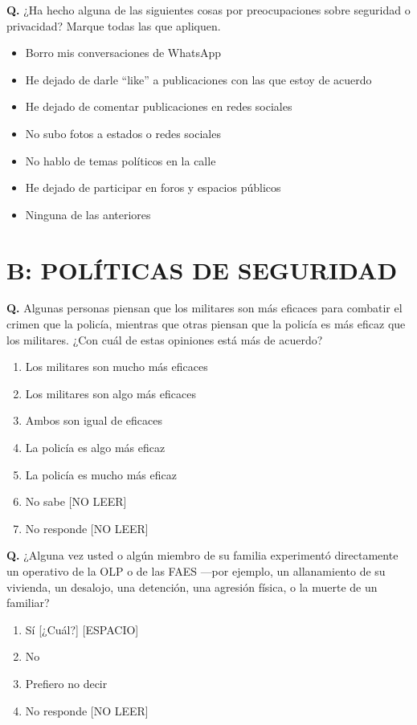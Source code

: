 \documentclass[11pt,letterpaper]{article}
\newcounter{question}
\newcommand{\question}[1]{%
  \stepcounter{question}%
  \vspace{0.3em}%
  \noindent\textbf{Q\thequestion.} #1%
}
\newenvironment{responses}
{\begin{enumerate}[label=(\arabic*), leftmargin=2em, itemsep=0em, parsep=0em, topsep=0em]}
{\end{enumerate}\vspace{0.3em}}
\newenvironment{multiplechoice}
{\begin{itemize}[label=\textbf{[~]}, leftmargin=2em, itemsep=0em, parsep=0em, topsep=0em]}
{\end{itemize}\vspace{0.3em}}
\begin{document}
\question{¿Ha hecho alguna de las siguientes cosas por preocupaciones sobre seguridad o privacidad? Marque todas las que apliquen.}
\begin{multiplechoice}
\item Borro mis conversaciones de WhatsApp
\item He dejado de darle ``like'' a publicaciones con las que estoy de acuerdo
\item He dejado de comentar publicaciones en redes sociales
\item No subo fotos a estados o redes sociales
\item No hablo de temas políticos en la calle
\item He dejado de participar en foros y espacios públicos
\item Ninguna de las anteriores
\end{multiplechoice}

\section{B: POLÍTICAS DE SEGURIDAD}

\question{Algunas personas piensan que los militares son más eficaces para combatir el crimen que la policía, mientras que otras piensan que la policía es más eficaz que los militares. ¿Con cuál de estas opiniones está más de acuerdo?}
\begin{responses}
\item Los militares son mucho más eficaces
\item Los militares son algo más eficaces
\item Ambos son igual de eficaces
\item La policía es algo más eficaz
\item La policía es mucho más eficaz
\item[(98)] No sabe [NO LEER]
\item[(99)] No responde [NO LEER]
\end{responses}

\question{¿Alguna vez usted o algún miembro de su familia experimentó directamente un operativo de la OLP o de las FAES —por ejemplo, un allanamiento de su vivienda, un desalojo, una detención, una agresión física, o la muerte de un familiar?}
\begin{responses}
\item Sí [¿Cuál?] [ESPACIO]
\item No
\item Prefiero no decir
\item[(99)] No responde [NO LEER]
\end{responses}
\end{document}
